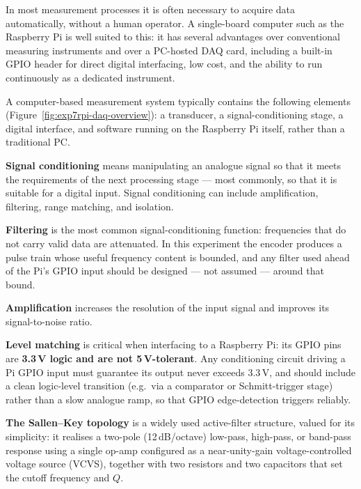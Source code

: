 \begin{introduction}
  In most measurement processes it is often necessary to acquire data automatically, without a human operator. A single-board computer such as the Raspberry Pi is well suited to this: it has several advantages over conventional measuring instruments and over a PC-hosted DAQ card, including a built-in GPIO header for direct digital interfacing, low cost, and the ability to run continuously as a dedicated instrument.\vspace*{10pt}

  A computer-based measurement system typically contains the following elements (Figure~\ref{fig:exp7rpi-daq-overview}): a transducer, a signal-conditioning stage, a digital interface, and software running on the Raspberry Pi itself, rather than a traditional PC.\newpage

  \textbf{Signal conditioning} means manipulating an analogue signal so that it meets the requirements of the next processing stage --- most commonly, so that it is suitable for a digital input. Signal conditioning can include amplification, filtering, range matching, and isolation.\vspace*{10pt}

  \textbf{Filtering} is the most common signal-conditioning function: frequencies that do not carry valid data are attenuated. In this experiment the encoder produces a pulse train whose useful frequency content is bounded, and any filter used ahead of the Pi's GPIO input should be designed --- not assumed --- around that bound.\vspace*{10pt}

  \textbf{Amplification} increases the resolution of the input signal and improves its signal-to-noise ratio.\vspace*{10pt}

  \textbf{Level matching} is critical when interfacing to a Raspberry Pi: its GPIO pins are \textbf{3.3\,V logic and are not 5\,V-tolerant}. Any conditioning circuit driving a Pi GPIO input must guarantee its output never exceeds 3.3\,V, and should include a clean logic-level transition (e.g.\ via a comparator or Schmitt-trigger stage) rather than a slow analogue ramp, so that GPIO edge-detection triggers reliably.\vspace*{10pt}

  \textbf{The Sallen--Key topology} is a widely used active-filter structure, valued for its simplicity: it realises a two-pole (12\,dB/octave) low-pass, high-pass, or band-pass response using a single op-amp configured as a near-unity-gain voltage-controlled voltage source (VCVS), together with two resistors and two capacitors that set the cutoff frequency and $Q$.
\end{introduction}
\vspace*{1.5em}

